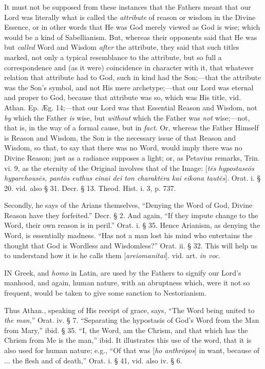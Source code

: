 It must not be supposed from these instances that
the Fathers meant that our Lord was literally what is called the \emph{attribute}
of reason or wisdom in the Divine Essence, or in other words that He
was God merely viewed as God is wise; which would be a kind of
Sabellianism. But, whereas their opponents said that He was but \emph{called}
Word and Wisdom \emph{after} the attribute, they said that such titles
marked, not only a typical resemblance to the attribute, but so full a
correspondence and (as it were) coincidence in character with it, that
whatever relation that attribute had to God, such in kind had
the Son;—that the attribute was the Son's symbol, and not His mere
archetype;—that our Lord was eternal and proper to God, because that
attribute was so, which was His title, vid. Athan. Ep. Æg. 14;—that
our Lord was that Essential Reason and Wisdom, not \emph{by} which the
Father \emph{is} wise, but \emph{without} which the Father was \emph{not}
wise;—not, that is, in the way of a formal cause, but in \emph{fact}.
Or, whereas the Father Himself is Reason and Wisdom, the Son is the
necessary issue of that Reason and Wisdom, so that, to say that there
was no Word, would imply there was no Divine Reason; just as a
radiance supposes a light; or, as Petavius remarks, Trin. vi. 9, as
the eternity of the Original involves that of the Image: [\emph{t\={e}s
hypostase\={o}s hyparchous\={e}s, pant\={o}s euthus einai dei
ton charakt\={e}ra kai eikona taut\={e}s}]. Orat. i. § 20.
vid. also § 31. Decr. § 13. Theod. Hist. i. 3, p. 737.

Secondly, he says of the Arians themselves, ``Denying
the Word of God, Divine Reason have they forfeited.'' Decr. § 2. And
again, ``If they impute change to the Word, their own reason is in
peril.'' Orat. i. § 35. Hence Arianism, as denying the Word, is
essentially madness. ``Has not a man lost his mind who entertains the
thought that God is Wordless and Wisdomless?'' Orat. ii. § 32. This
will help us to understand how it is he calls them [\emph{areiomanitai}].
vid. art. \emph{in voc}.

\xsection{[Anthropos]}

IN
Greek, and \emph{homo} in Latin, are used by the Fathers to signify
our Lord's manhood, and again, human nature, with an abruptness which,
were it not so frequent, would be taken to give some sanction to
Nestorianism.

Thus Athan., speaking of His receipt of grace,
says, ``The Word being united to \emph{the man},'' Orat. iv. § 7. ``Separating
the hypostasis of God's Word from the Man from Mary,'' ibid. § 35. ``I,
the Word, am the Chrism, and that which has the Chrism from Me is the
man,'' ibid. It illustrates this use of the word, that it is also used
for human nature; e.g., ``Of that was [\emph{ho anthr\={o}pos}] in
want, because of ... the flesh and of death,'' Orat. i. § 41, vid.
also iv. § 6.

